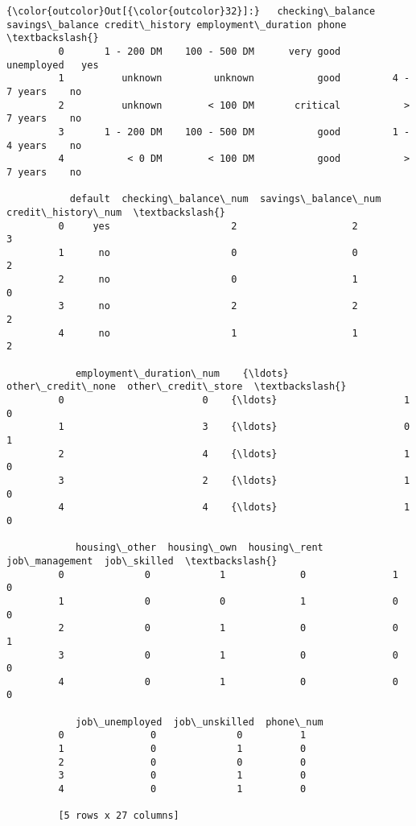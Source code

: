 \documentclass[11pt]{article}
\begin{document}
\begin{Verbatim}[commandchars=\\\{\}]
{\color{outcolor}Out[{\color{outcolor}32}]:}   checking\_balance savings\_balance credit\_history employment\_duration phone  \textbackslash{}
         0       1 - 200 DM    100 - 500 DM      very good          unemployed   yes   
         1          unknown         unknown           good         4 - 7 years    no   
         2          unknown        < 100 DM       critical           > 7 years    no   
         3       1 - 200 DM    100 - 500 DM           good         1 - 4 years    no   
         4           < 0 DM        < 100 DM           good           > 7 years    no   
         
           default  checking\_balance\_num  savings\_balance\_num  credit\_history\_num  \textbackslash{}
         0     yes                     2                    2                   3   
         1      no                     0                    0                   2   
         2      no                     0                    1                   0   
         3      no                     2                    2                   2   
         4      no                     1                    1                   2   
         
            employment\_duration\_num    {\ldots}      other\_credit\_none  other\_credit\_store  \textbackslash{}
         0                        0    {\ldots}                      1                   0   
         1                        3    {\ldots}                      0                   1   
         2                        4    {\ldots}                      1                   0   
         3                        2    {\ldots}                      1                   0   
         4                        4    {\ldots}                      1                   0   
         
            housing\_other  housing\_own  housing\_rent  job\_management  job\_skilled  \textbackslash{}
         0              0            1             0               1            0   
         1              0            0             1               0            0   
         2              0            1             0               0            1   
         3              0            1             0               0            0   
         4              0            1             0               0            0   
         
            job\_unemployed  job\_unskilled  phone\_num  
         0               0              0          1  
         1               0              1          0  
         2               0              0          0  
         3               0              1          0  
         4               0              1          0  
         
         [5 rows x 27 columns]
\end{Verbatim}
            
\end{document}
